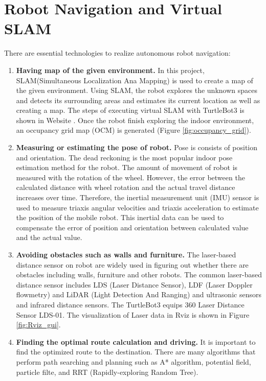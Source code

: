 \section{Robot Navigation and Virtual SLAM}
\label{sec:navigation}

There are essential technologies to realize autonomous robot navigation: 
\begin{enumerate}
    \item \textbf{Having map of the given environment.} In this project, SLAM(Simultaneous Localization Ana Mapping) is used to create a map of the given environment. Using SLAM, the robot explores the unknown spaces and detects its surrounding areas and estimates its current location as well as creating a map. The steps of executing virtual SLAM with TurtleBot3 is shown in Website \cite{T3SLAM}. Once the robot finish exploring the indoor environment, an occupancy grid map (OCM) is generated (Figure \ref{fig:occupancy_grid}).
    \item \textbf{Measuring or estimating the pose of robot.} Pose is consists of position and orientation. The dead reckoning \cite{DEADRECKONING} is the most popular indoor pose estimation method for the robot. The amount of movement of robot is measured with the rotation of the wheel. However, the error between the calculated distance with wheel rotation and the actual travel distance increases over time. Therefore, the inertial measurement unit (IMU) sensor\cite{Woojin17} is used to measure triaxis angular velocities and triaxis acceleration to estimate the position of the mobile robot.  This inertial data can be used to compensate the error of position and orientation between calculated value and the actual value.
    \item \textbf{Avoiding obstacles such as walls and furniture.} The laser-based distance sensor on robot are widely used in figuring out whether there are obstacles including walls, furniture and other robots. The common laser-based distance sensor includes LDS (Laser Distance Sensor), LDF (Laser Doppler flowmetry) and LiDAR (Light Detection And Ranging) and ultrasonic sensors and infrared distance sensors. The TurtleBot3 equips 360 Laser Distance Sensor LDS-01. The visualization of Laser data in Rviz is shown in Figure \ref{fig:Rviz_gui}.
    \item \textbf{Finding the optimal route calculation and driving.} It is important to find the optimized route to the destination. There are many algorithms that perform path searching and planning such as A* algorithm\cite{ASEARCH}, potential field\cite{POTENTIAL}, particle filte\cite{PARTICLE}, and RRT (Rapidly-exploring Random Tree)\cite{RRT}.

\end{enumerate}
